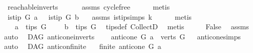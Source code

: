 \begin{isabellebody}
\ \ reachable{}{\isacharunderscore}{\kern0pt}in{\isacharunderscore}{\kern0pt}verts\isanewline
\ \ \ \ \ \ assms{\isacharparenleft}{\kern0pt}{}{\isacharparenright}{\kern0pt}\ cycle{\isacharunderscore}{\kern0pt}free\isanewline
\ \ \ \ \isamarkupfalse%
\ {\isacharparenleft}{\kern0pt}metis{\isacharparenright}{\kern0pt}\ \isanewline
\ \ \isamarkupfalse%
\ \isamarkupfalse%
\ {\isachardoublequoteopen}{\isasymnot}\ is{\isacharunderscore}{\kern0pt}tip\ G\ a\ {\isasymor}\ {\isasymnot}\ is{\isacharunderscore}{\kern0pt}tip\ G\ b{\isachardoublequoteclose}\ \isamarkupfalse%
\ \ assms{\isacharparenleft}{\kern0pt}{}{\isacharparenright}{\kern0pt}\ is{\isacharunderscore}{\kern0pt}tip{\isachardot}{\kern0pt}simps\ k\isanewline
\ \ \ \ \isamarkupfalse%
\ {\isacharparenleft}{\kern0pt}metis{\isacharparenright}{\kern0pt}\isanewline
\ \ \isamarkupfalse%
\ \isamarkupfalse%
\ {\isachardoublequoteopen}\ \ {\isasymnot}\ a\ {\isasymin}\ tips\ G\ {\isasymor}\ \ {\isasymnot}\ \ b\ {\isasymin}\ tips\ G{\isachardoublequoteclose}\ \isamarkupfalse%
\ tips{\isacharunderscore}{\kern0pt}def\ CollectD\ \isamarkupfalse%
\ metis\isanewline
\ \ \isamarkupfalse%
\ \isamarkupfalse%
\ False\ \isamarkupfalse%
\ assms\ \isamarkupfalse%
\ auto\isanewline
{}\isamarkupfalse%
%
\endisatagproof
{\isafoldproof}%
%
\isadelimproof
\isanewline
%
\endisadelimproof
\isanewline
{}\isamarkupfalse%
\ {\isacharparenleft}{\kern0pt}\ DAG{\isacharparenright}{\kern0pt}\ anticone{\isacharunderscore}{\kern0pt}in{\isacharunderscore}{\kern0pt}verts{\isacharcolon}{\kern0pt}\ \isanewline
\ \ \ {\isachardoublequoteopen}anticone\ G\ a\ {\isasymsubseteq}\ verts\ G{\isachardoublequoteclose}%
\isadelimproof
\ %
\endisadelimproof
%
\isatagproof
{}\isamarkupfalse%
\ anticone{\isachardot}{\kern0pt}simps\ \isamarkupfalse%
\ auto%
\endisatagproof
{\isafoldproof}%
%
\isadelimproof
%
\endisadelimproof
\isanewline
\isanewline
{}\isamarkupfalse%
\ {\isacharparenleft}{\kern0pt}\ DAG{\isacharparenright}{\kern0pt}\ anticon{\isacharunderscore}{\kern0pt}finite{\isacharcolon}{\kern0pt}\isanewline
\ \ \ {\isachardoublequoteopen}finite\ {\isacharparenleft}{\kern0pt}anticone\ G\ a{\isacharparenright}{\kern0pt}{\isachardoublequoteclose}%
\isadelimproof
\ %
\endisadelimproof

\end{isabellebody}

